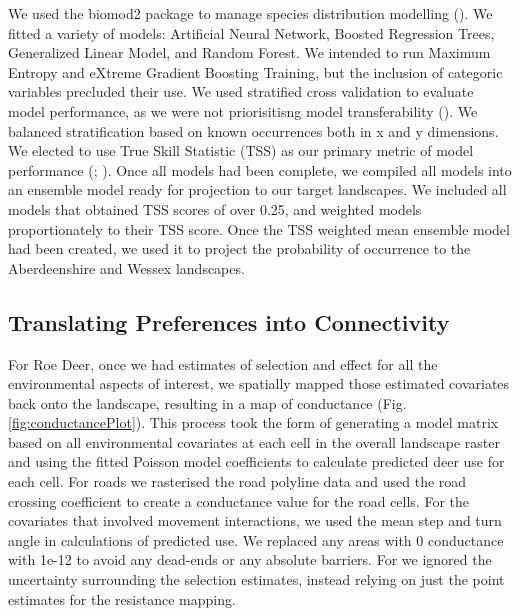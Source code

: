 \documentclass[10pt,a4paper]{article}
\begin{document}
We used the biomod2 package to manage species distribution modelling ().
We fitted a variety of models: Artificial Neural Network, Boosted Regression Trees, Generalized Linear Model, and Random Forest.
We intended to run Maximum Entropy and eXtreme Gradient Boosting Training, but the inclusion of categoric variables precluded their use.
We used stratified cross validation to evaluate model performance, as we were not priorisitisng model transferability ().
We balanced stratification based on known occurrences both in x and y dimensions.
We elected to use True Skill Statistic (TSS) as our primary metric of model performance (; ).
Once all models had been complete, we compiled all models into an ensemble model ready for projection to our target landscapes.
We included all models that obtained TSS scores of over 0.25, and weighted models proportionately to their TSS score.
Once the TSS weighted mean ensemble model had been created, we used it to project the probability of occurrence to the Aberdeenshire and Wessex landscapes.

\subsection{Translating Preferences into Connectivity}\label{translating-preferences-into-connectivity}

For Roe Deer, once we had estimates of selection and effect for all the environmental aspects of interest, we spatially mapped those estimated covariates back onto the landscape, resulting in a map of conductance (Fig. \ref{fig:conductancePlot}).
This process took the form of generating a model matrix based on all environmental covariates at each cell in the overall landscape raster and using the fitted Poisson model coefficients to calculate predicted deer use for each cell.
For roads we rasterised the road polyline data and used the road crossing coefficient to create a conductance value for the road cells.
For the covariates that involved movement interactions, we used the mean step and turn angle in calculations of predicted use.
We replaced any areas with 0 conductance with 1e-12 to avoid any dead-ends or any absolute barriers.
For we ignored the uncertainty surrounding the selection estimates, instead relying on just the point estimates for the resistance mapping.
\end{document}
